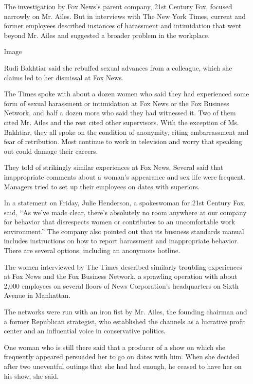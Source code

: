 The investigation by Fox News's parent company, 21st Century Fox,
focused narrowly on Mr. Ailes. But in interviews with The New York
Times, current and former employees described instances of harassment
and intimidation that went beyond Mr. Ailes and suggested a broader
problem in the workplace.

Image

Rudi Bakhtiar said she rebuffed sexual advances from a colleague, which
she claims led to her dismissal at Fox News.

The Times spoke with about a dozen women who said they had experienced
some form of sexual harassment or intimidation at Fox News or the Fox
Business Network, and half a dozen more who said they had witnessed it.
Two of them cited Mr. Ailes and the rest cited other supervisors. With
the exception of Ms. Bakhtiar, they all spoke on the condition of
anonymity, citing embarrassment and fear of retribution. Most continue
to work in television and worry that speaking out could damage their
careers.

They told of strikingly similar experiences at Fox News. Several said
that inappropriate comments about a woman's appearance and sex life were
frequent. Managers tried to set up their employees on dates with
superiors.

In a statement on Friday, Julie Henderson, a spokeswoman for 21st
Century Fox, said, ``As we've made clear, there's absolutely no room
anywhere at our company for behavior that disrespects women or
contributes to an uncomfortable work environment.'' The company also
pointed out that its business standards manual includes instructions on
how to report harassment and inappropriate behavior. There are several
options, including an anonymous hotline.

The women interviewed by The Times described similarly troubling
experiences at Fox News and the Fox Business Network, a sprawling
operation with about 2,000 employees on several floors of News
Corporation's headquarters on Sixth Avenue in Manhattan.

The networks were run with an iron fist by Mr. Ailes, the founding
chairman and a former Republican strategist, who established the
channels as a lucrative profit center and an influential voice in
conservative politics.

One woman who is still there said that a producer of a show on which she
frequently appeared persuaded her to go on dates with him. When she
decided after two uneventful outings that she had had enough, he ceased
to have her on his show, she said.

